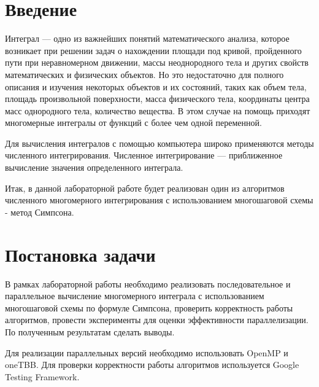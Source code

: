 \documentclass{report}
\begin{document}
\setcounter{page}{2}

\tableofcontents
\newpage

\section*{Введение}
Интеграл — одно из важнейших понятий математического анализа, которое возникает при решении задач о нахождении площади под кривой, пройденного пути при неравномерном движении, массы неоднородного тела и других свойств математических и физических объектов. Но это недостаточно для полного описания и изучения некоторых объектов и их состояний, таких как объем тела, площадь произвольной поверхности, масса физического тела, координаты центра масс однородного тела, количество вещества. В этом случае на помощь приходят многомерные интегралы от функций с более чем одной переменной.
\par Для вычисления интегралов с помощью компьютера широко применяются методы численного интегрирования. Численное интегрирование — приближенное вычисление значения определенного интеграла.
\par Итак, в данной лабораторной работе будет реализован один из алгоритмов численного многомерного интегрирования с использованием многошаговой схемы - метод Симпсона.
\newpage

\section*{Постановка задачи}
В рамках лабораторной работы необходимо реализовать последовательное и параллельное вычисление многомерного интеграла с использованием многошаговой схемы по формуле Симпсона, проверить корректность работы алгоритмов, провести эксперименты для оценки эффективности параллелизации. По полученным результатам сделать выводы.
\par Для реализации параллельных версий необходимо использовать OpenMP и oneTBB. Для проверки корректности работы алгоритмов используется Google Testing Framework.
\newpage

\end{document}
